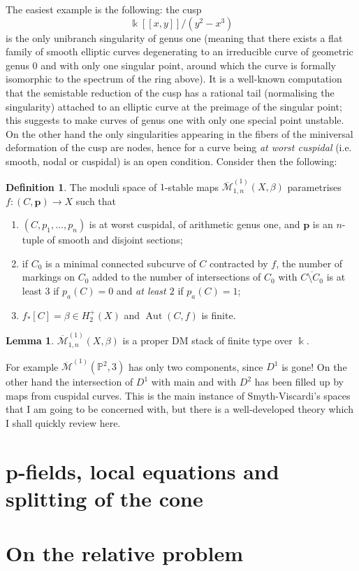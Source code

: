 \documentclass[11pt]{amsart}
\newcommand{\pazocal}{\mathcal}
\newcommand{\oM}{\overline{\mathcal{M}}}
\newcommand{\Mone}[3]{\overline{\pazocal M}^{(1)}_{1,#1}(#2,#3)}
\newcommand{\PP}{\mathbb P}
\renewcommand{\to}{\rightarrow}
\newcommand{\kk}{\Bbbk}
\newcommand{\Aut}{\operatorname{Aut}}
\theoremstyle{definition}
\newtheorem{lemma}[thm]{Lemma}
\theoremstyle{definition}
\newtheorem{dfn}[thm]{Definition}
\begin{document}
The easiest example is the following: the cusp
\[\kk[\![x,y]\!]/(y^2-x^3)\]
is the only unibranch singularity of genus one (meaning that there exists a flat family of smooth elliptic curves degenerating to an irreducible curve of geometric genus $0$ and with only one singular point, around which the curve is formally isomorphic to the spectrum of the ring above). It is a well-known computation \cite[\S 3.C]{HM} that the semistable reduction of the cusp has a rational tail (normalising the singularity) attached to an elliptic curve at the preimage of the singular point; this suggests to make curves of genus one with only one special point unstable. On the other hand the only singularities appearing in the fibers of the miniversal deformation of the cusp are nodes, hence for a curve being \emph{at worst cuspidal} (i.e. smooth, nodal or cuspidal) is an open condition. Consider then the following:
\begin{dfn}
 The moduli space of $1$-stable maps $\Mone{n}{X}{\beta}$ parametrises $f\colon (C,\mathbf p)\to X$ such that
 \begin{enumerate}
  \item $(C,p_1,\ldots,p_n)$ is at worst cuspidal, of arithmetic genus one, and $\mathbf p$ is an $n$-tuple of smooth and disjoint sections;
  \item if $C_0$ is a minimal connected subcurve of $C$ contracted by $f$, the number of markings on $C_0$ added to the number of intersections of $C_0$ with $\overline{C\setminus C_0}$ is at least $3$ if $p_a(C)=0$ and \emph{at least $2$} if $p_a(C)=1$;
  \item $f_*[C]=\beta\in H^+_2(X)$ and $\Aut(C,f)$ is finite.
 \end{enumerate}
\end{dfn}
\begin{lemma}
 $\Mone{n}{X}{\beta}$ is a proper DM stack of finite type over $\kk$.
\end{lemma}
For example $\oM^{(1)}(\PP^2,3)$ has only two components, since $D^1$ is gone! On the other hand the intersection of $D^1$ with main and with $D^2$ has been filled up by maps from cuspidal curves. This is the main instance of Smyth-Viscardi's spaces that I am going to be concerned with, but there is a well-developed theory which I shall quickly review here.




\section{p-fields, local equations and splitting of the cone}

\section{On the relative problem}




\end{document}
